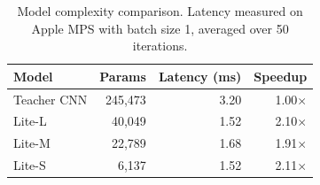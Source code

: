 \begin{table}[t]
\centering
\caption{Model complexity comparison. Latency measured on Apple MPS with batch size 1, averaged over 50 iterations.}
\label{tab:complexity}
\begin{tabular}{lrrr}
\toprule
Model & Params & Latency (ms) & Speedup \\
\midrule
Teacher CNN & 245,473 & 3.20 & 1.00$\times$ \\
Lite-L & 40,049 & 1.52 & 2.10$\times$ \\
Lite-M & 22,789 & 1.68 & 1.91$\times$ \\
Lite-S & 6,137 & 1.52 & 2.11$\times$ \\
\bottomrule
\end{tabular}
\end{table}
